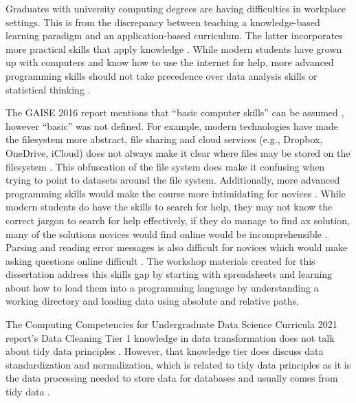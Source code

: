 \documentclass[010-intro.tex]{subfiles}
\begin{document}
    Graduates with university computing degrees are having difficulties in workplace settings.
    This is from the discrepancy between teaching a knowledge-based learning paradigm and an application-based curriculum.
    The latter incorporates more practical skills that apply knowledge
    \cite{cc2005, cc2020}.
    While modern students have grown up with computers and know how to use the internet for help,
    more advanced programming skills should not take precedence over data analysis skills or statistical thinking
    \cite{gaise2016}.

    The GAISE 2016 report mentions that ``basic computer skills'' can be assumed
    \cite{gaise2016},
    however ``basic'' was not defined.
    For example,
    modern technologies have made the filesystem more abstract,
    file sharing and cloud services (e.g., Dropbox, OneDrive, iCloud)
    does not always make it clear where files may be stored on the filesystem
    \cite{chinStudentsWhoGrew2021, macgregorStudentsDonKnow2021}.
    This obfuscation of the file system does make it confusing when trying to point to datasets around the file system.
    Additionally, more advanced programming skills would make the course more intimidating for novices
    \cite{kelleherLoweringBarriersProgramming2005, thecarpentriesCarpentryTrainerTraining}.
    While modern students do have the skills to search for help,
    they may not know the correct jargon to search for help effectively,
    if they do manage to find ax solution,
    many of the solutions novices would find online would be incomprehensible
    \cite{wilson2019teaching, Koch2016, thecarpentriesCarpentryTrainerTraining, ambrose2010learning, hermansProgrammerBrain2021}.
    Parsing and reading error messages is also difficult for novices which would make asking questions online difficult
    \cite{wilson2019teaching, Koch2016, thecarpentriesCarpentryTrainerTraining, hermansProgrammerBrain2021}.
    The workshop materials created for this dissertation address this skills gap
    by starting with spreadsheets and learning about how to load them into a programming language
    by understanding a working directory and loading data using absolute and relative paths.

    The Computing Competencies for Undergraduate Data Science Curricula 2021 report's
    Data Cleaning Tier 1 knowledge in data transformation does not talk about tidy data principles
    \cite{ccdsc2021}.
    However, that knowledge tier does discuss data standardization and normalization,
    which is related to tidy data principles as it is the data processing needed to store data for databases and
    usually comes from tidy data
    \cite{wickhamTidyData2014}.
\end{document}

